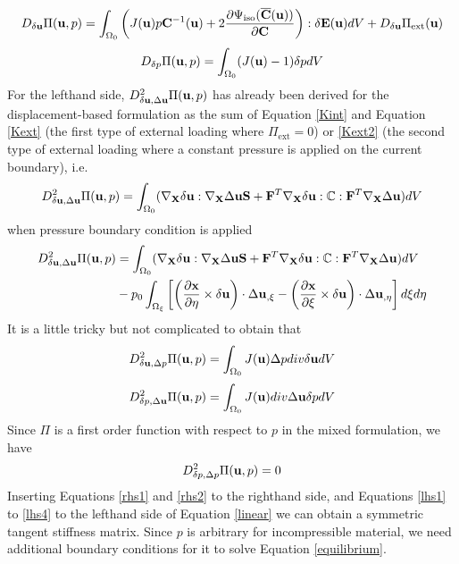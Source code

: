 \begin{equation}\label{rhs1}
D_{\delta\bold{u}}\Pi(\bold{u}, p) = \int_{\Omega_0}\left( J(\bold{u})p\bold{C}^{-1}(\bold{u}) + 
2\frac{\partial{\Psi_\mathrm{iso}(\overline{\bold{C}}(\bold{u}))}}{\partial{\bold{C}}}  \right) : \delta\bold{E}(\bold{u}) dV + D_{\delta\bold{u}}\Pi_\mathrm{ext}(\bold{u})
\end{equation}
\begin{equation}\label{rhs2}
D_{\delta{p}}\Pi(\bold{u}, p) = \int_{\Omega_0} (J(\bold{u}) - 1 )\delta{p} dV
\end{equation}
For the lefthand side, $D_{\delta\bold{u}, \Delta\bold{u}}^2 \Pi(\bold{u}, p)$ has already been derived for the displacement-based formulation as the sum of Equation \ref{Kint} and Equation \ref{Kext} (the first type of external loading where $\Pi_\mathrm{ext} = 0$) or \ref{Kext2} (the second type of external loading where a constant pressure is applied on the current boundary), i.e.
\begin{equation} \label{lhs0}
D_{\delta\bold{u}, \Delta\bold{u}}^2 \Pi(\bold{u}, p) =  \int_{\Omega_0}(\nabla_{\bold{X}}\delta\bold{u} : \nabla_{\bold{X}}\Delta\bold{u}\bold{S} + \bold{F}^T\nabla_{\bold{X}}\delta{\bold{u}} : \mathbb{C} : \bold{F}^T \nabla_{\bold{X}}\Delta\bold{u})dV  \end{equation}
when pressure boundary condition is applied
\begin{equation} \label{lhs1}
\begin{split}
D_{\delta\bold{u}, \Delta\bold{u}}^2 \Pi(\bold{u}, p) 
&= \int_{\Omega_0}(\nabla_{\bold{X}}\delta\bold{u} : \nabla_{\bold{X}}\Delta\bold{u}\bold{S} + \bold{F}^T\nabla_{\bold{X}}\delta{\bold{u}} : \mathbb{C} : \bold{F}^T \nabla_{\bold{X}}\Delta\bold{u})dV  \\
&-  p_0\int_{\Omega_{\xi}}  \left[\left(\frac{\partial{\bold{x}}}{\partial{\eta}} \times \delta\bold{u}\right) \cdot\Delta{\bold{u}}_{,\xi} - 
\left(\frac{\partial{\bold{x}}}{\partial{\xi}} \times \delta\bold{u}\right) \cdot\Delta{\bold{u}}_{,\eta} \right]d\xi{d\eta}
\end{split}
\end{equation}
It is a little tricky but not complicated to obtain that
\begin{equation} \label{lhs2}
D_{\delta\bold{u}, \Delta{p}}^2 \Pi(\bold{u}, p) = \int_{\Omega_0} J(\bold{u})\Delta{p}div\delta{\bold{u}}dV
\end{equation}
\begin{equation} \label{lhs3}
D_{\delta{p}, \Delta\bold{u}}^2 \Pi(\bold{u}, p) = \int_{\Omega_0} J(\bold{u})div\Delta{\bold{u}}\delta{p}dV
\end{equation}
Since $\Pi$ is a first order function with respect to $p$ in the mixed formulation, we have
\begin{equation} \label{lhs4}
D_{\delta{p}, \Delta{p}}^2 \Pi(\bold{u}, p) = 0
\end{equation}
Inserting Equations \ref{rhs1} and \ref{rhs2} to the righthand side, and Equations \ref{lhs1} to \ref{lhs4} to the lefthand side of Equation \ref{linear} we can obtain a symmetric tangent stiffness matrix. Since $p$ is arbitrary for incompressible material, we need additional boundary conditions for it to solve Equation \ref{equilibrium}.

